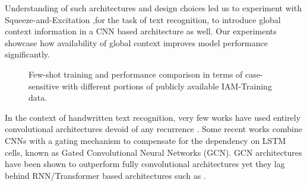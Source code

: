 \documentclass{article}
\begin{document}
Understanding of such architectures and design choices led us to experiment with Squeeze-and-Excitation \cite{hu2018squeeze} ,for the task of text recognition, to introduce global context information in a CNN based architecture\cite{han2020contextnet} as well. Our experiments showcase how availability of global context improves model performance significantly.

\begin{figure}[H]
\centering
{}
     \caption{Few-shot training and performance comparison in terms of case-sensitive  with different portions of publicly available IAM-Training data.}
     \label{fig:comparison2}
\end{figure}


In the context of handwritten text recognition, very few works have used entirely convolutional architectures devoid of any recurrence \cite{Chaudhary2021EASTER,ptucha2019intelligent,yousef2020accurate}. Some recent works\cite{ingle2019scalable,coquenet2020recurrence} combine CNNs with a gating mechanism to compensate for the dependency on LSTM cells, known as Gated Convolutional Neural Networks (GCN). GCN architectures have been shown to outperform fully convolutional architectures yet they lag behind RNN/Transformer based architectures such as \cite{kang2020pay,diaz2021rethinking,li2021trocr}. 
\end{document}
